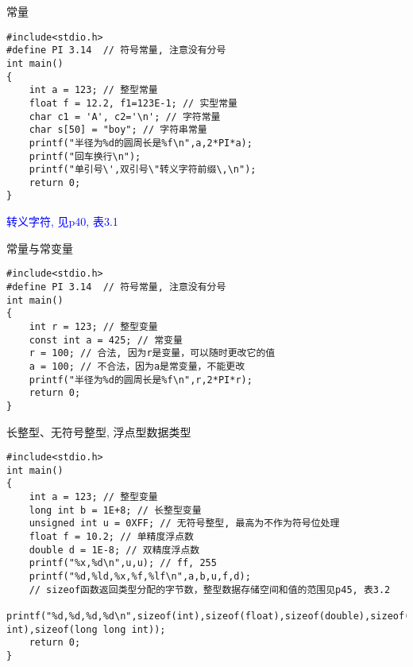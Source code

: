 \begin{frame}{常量}
\vspace{-0.2cm}
\begin{lstlisting}
#include<stdio.h> 
#define PI 3.14  // 符号常量, 注意没有分号           
int main()                   
{                                  
	int a = 123; // 整型常量
	float f = 12.2, f1=123E-1; // 实型常量
	char c1 = 'A', c2='\n'; // 字符常量
	char s[50] = "boy"; // 字符串常量
	printf("半径为%d的圆周长是%f\n",a,2*PI*a);       
	printf("回车换行\n");
	printf("单引号\',双引号\"转义字符前缀\,\n");  
	return 0;           
}                            
\end{lstlisting}
\textcolor{blue}{转义字符, 见p40, 表3.1}
\end{frame}

\begin{frame}[fragile]{常量与常变量}
\begin{lstlisting}
#include<stdio.h> 
#define PI 3.14  // 符号常量, 注意没有分号           
int main()                   
{                            
	int r = 123; // 整型变量
	const int a = 425; // 常变量
	r = 100; // 合法, 因为r是变量，可以随时更改它的值
	a = 100; // 不合法，因为a是常变量，不能更改
	printf("半径为%d的圆周长是%f\n",r,2*PI*r); 
	return 0;           
}                            
\end{lstlisting}
\end{frame}

\begin{frame}{长整型、无符号整型, 浮点型数据类型}
\begin{lstlisting}
#include<stdio.h>           
int main()                   
{                            
	int a = 123; // 整型变量
	long int b = 1E+8; // 长整型变量
	unsigned int u = 0XFF; // 无符号整型, 最高为不作为符号位处理
	float f = 10.2; // 单精度浮点数
	double d = 1E-8; // 双精度浮点数
	printf("%x,%d\n",u,u); // ff, 255
	printf("%d,%ld,%x,%f,%lf\n",a,b,u,f,d);
	// sizeof函数返回类型分配的字节数，整型数据存储空间和值的范围见p45, 表3.2
	printf("%d,%d,%d,%d\n",sizeof(int),sizeof(float),sizeof(double),sizeof(long int),sizeof(long long int));
	return 0;           
}                            
\end{lstlisting}
\end{frame}



